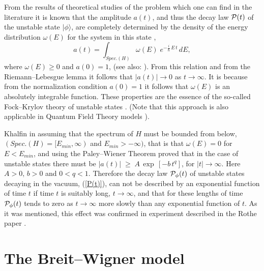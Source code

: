 \documentclass[12pt]{article}
\begin{document}
From the results of theoretical studies of the problem which one can find in
the literature it is known that the
amplitude $a(t)$, and thus the decay law ${\cal P}(t)$ of the
unstable state $|\phi\rangle$, are completely determined by the
density of the energy distribution $\omega(E)$ for the system
in this state \cite{fock},
\begin{equation}
a(t) = \int_{Spec.(H)} \omega(E)\;e^{\textstyle{-\frac{i}{\hbar}\,E\,t}}\,dE, \label{a-spec-1}
\end{equation}
where $\omega(E) \geq 0$  and $a(0) = 1$,
(see also: \cite{khalfin,fonda,nowakowski,giraldi}).
From this
relation and from the Riemann--Lebesgue lemma it follows that
$|a(t)| \to 0$ as $t \to \infty$. It is because from the normalization
condition $a(0) = 1$
it follows that $\omega (E)$ is an absolutely integrable function.
These properties are the essence of the so-called Fock--Krylov theory of unstable states \cite{fock}.
(Note that this approach is also applicable in Quantum Field Theory models \cite{giacosa2,goldberger}).


Khalfin in  \cite{khalfin}
assuming that the spectrum of $H$ must be bounded
from below, $(Spec.(H) = [E_{min},\infty)$ and $E_{min} > -\infty)$, that is that
$\omega (E) = 0$ for $E < E_{min}$,
and using the Paley--Wiener
Theorem  \cite{Paley}
proved that in the case of unstable
states there must be
$|a(t)| \; \geq \; A\,\exp\,[- b \,t^{q}]$,
for $|t| \rightarrow \infty$. Here $A > 0,\,b> 0$ and $ 0 < q < 1$.
Therefore
the decay law ${\cal P}_{\phi}(t)$ of unstable
states decaying in the vacuum, (\ref{P(t)}), can not be described by
an exponential function of time $t$ if time $t$ is suitably long, $t
\rightarrow \infty$, and that for these lengths of time ${\cal
P}_{\phi}(t)$ tends to zero as $t \rightarrow \infty$  more slowly
than any exponential function of $t$.
As it was mentioned, this effect was confirmed
in experiment described  in the Rothe paper \cite{rothe}.


\section{The Breit--Wigner model}
\end{document}
